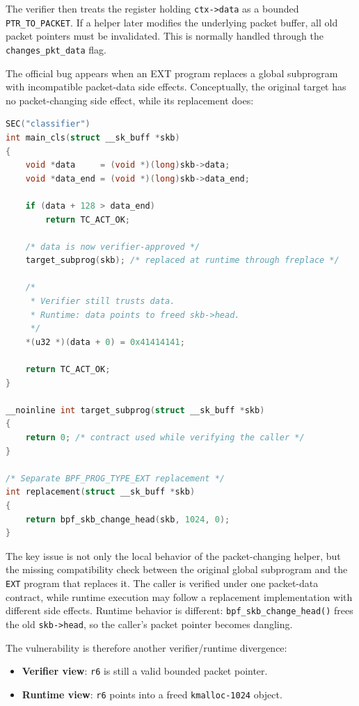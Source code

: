 \documentclass[../main.tex]{subfiles}
\begin{document}
The verifier then treats the register holding \texttt{ctx->data} as a bounded \texttt{PTR\_TO\_PACKET}. If a helper later modifies the underlying packet buffer, all old packet pointers must be invalidated. This is normally handled through the \texttt{changes\_pkt\_data} flag.

The official bug appears when an EXT program replaces a global subprogram with incompatible packet-data side effects. Conceptually, the original target has no packet-changing side effect, while its replacement does:

\begin{lstlisting}[language=C, caption={Vulnerable high-level pattern.}]
SEC("classifier")
int main_cls(struct __sk_buff *skb)
{
    void *data     = (void *)(long)skb->data;
    void *data_end = (void *)(long)skb->data_end;

    if (data + 128 > data_end)
        return TC_ACT_OK;

    /* data is now verifier-approved */
    target_subprog(skb); /* replaced at runtime through freplace */

    /*
     * Verifier still trusts data.
     * Runtime: data points to freed skb->head.
     */
    *(u32 *)(data + 0) = 0x41414141;

    return TC_ACT_OK;
}

__noinline int target_subprog(struct __sk_buff *skb)
{
    return 0; /* contract used while verifying the caller */
}

/* Separate BPF_PROG_TYPE_EXT replacement */
int replacement(struct __sk_buff *skb)
{
    return bpf_skb_change_head(skb, 1024, 0);
}
\end{lstlisting}

The key issue is not only the local behavior of the packet-changing helper, but the missing compatibility check between the original global subprogram and the \texttt{EXT} program that replaces it. The caller is verified under one packet-data contract, while runtime execution may follow a replacement implementation with different side effects. Runtime behavior is different: \texttt{bpf\_skb\_change\_head()} frees the old \texttt{skb->head}, so the caller's packet pointer becomes dangling.

The vulnerability is therefore another verifier/runtime divergence:

\begin{itemize}
    \item \textbf{Verifier view}: \texttt{r6} is still a valid bounded packet pointer.
    \item \textbf{Runtime view}: \texttt{r6} points into a freed \texttt{kmalloc-1024} object.
\end{itemize}
\end{document}
